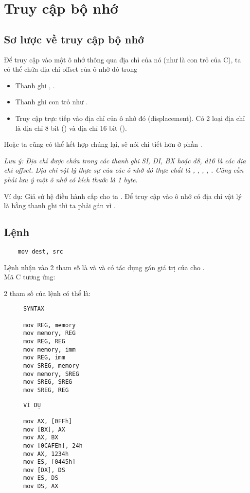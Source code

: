 \documentclass[main.tex]{subfiles}
\begin{document}
\section{Truy cập bộ nhớ} \label{sec:truycapbn}
\subsection{Sơ lược về truy cập bộ nhớ}
Để truy cập vào một ô nhớ thông qua địa chỉ của nó (như là con trỏ của C), ta có thể chứa địa chỉ offset của ô nhớ đó trong
\begin{itemize}
    \item Thanh ghi , .
    \item Thanh ghi con trỏ như .
    \item Truy cập trực tiếp vào địa chỉ của ô nhớ đó (displacement). Có 2 loại địa chỉ là địa chỉ 8-bit () và địa chỉ 16-bit ().
\end{itemize}
Hoặc ta cũng có thể kết hợp chúng lại, sẽ nói chi tiết hơn ở phần .

\textit{Lưu ý: Địa chỉ được chứa trong các thanh ghi SI, DI, BX hoặc d8, d16 là các địa chỉ offset. Địa chỉ vật lý thực sự của các ô nhớ đó thực chất là , , , , . Cũng cần phải lưu ý một ô nhớ có kích thước là 1 byte}.
\bigskip

Ví dụ: Giả sử hệ điều hành cấp cho ta .
Để truy cập vào ô nhớ có địa chỉ vật lý là  bằng thanh ghi  thì ta phải gán  vì .

\subsection{Lệnh }
\begin{verbatim}
    mov dest, src
\end{verbatim}
Lệnh  nhận vào 2 tham số là  và  và có tác dụng gán giá trị của  cho .\\
Mã C tương ứng: 

2 tham số của lệnh  có thể là:
\begin{figure}[H]
    \begin{minipage}{0.5\textwidth}
\begin{verbatim}
SYNTAX 

mov REG, memory
mov memory, REG
mov REG, REG
mov memory, imm
mov REG, imm
mov SREG, memory
mov memory, SREG 
mov SREG, SREG 
mov SREG, REG
\end{verbatim}
    \end{minipage}
    \hfill
        \begin{minipage}{0.5\textwidth}
\begin{verbatim}
VÍ DỤ 

mov AX, [0FFh]
mov [BX], AX
mov AX, BX
mov [0CAFEh], 24h
mov AX, 1234h
mov ES, [0445h]
mov [DX], DS 
mov ES, DS 
mov DS, AX
\end{verbatim}         
         \end{minipage}
\end{figure}
\end{document}
